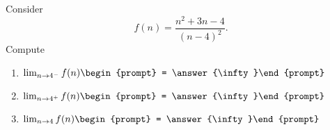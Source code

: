 \documentclass{ximera}
\author{Bart Snapp}
\begin{document}
\begin{exercise}
Consider 
\[
f(n) = \frac{n^2+3 n-4}{(n-4)^2}.
\]
Compute
\begin{enumerate}
\item $\lim_{n\to 4^- } f(n) \begin{prompt} = \answer{\infty}\end{prompt}$
\item $\lim_{n\to 4^+ } f(n) \begin{prompt} = \answer{\infty}\end{prompt}$
\item $\lim_{n\to 4 } f(n) \begin{prompt} = \answer{\infty}\end{prompt}$
\end{enumerate}
\end{exercise}
\end{document}
